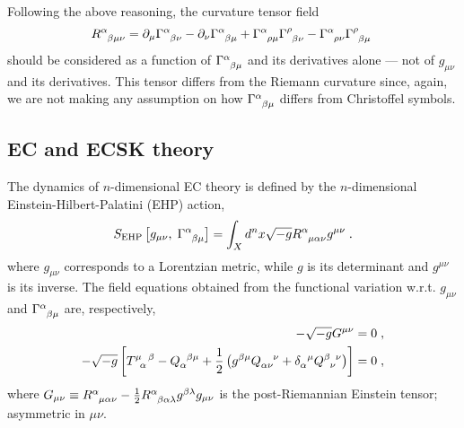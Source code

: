 \documentclass[../../main.tex]{subfiles}
\begin{document}
Following the above reasoning, the curvature tensor field
\begin{equation}
  \label{eq:curvaturetensor}
  \tensor{R}{^\alpha_{\beta\mu\nu}} = \partial_\mu\tensor{\Gamma}{^\alpha_{\beta\nu}}-\partial_\nu\tensor{\Gamma}{^\alpha_{\beta\mu}}+\tensor{\Gamma}{^\alpha_{\rho\mu}}\tensor{\Gamma}{^\rho_{\beta\nu}}-\tensor{\Gamma}{^\alpha_{\rho\nu}}\tensor{\Gamma}{^\rho_{\beta\mu}} \;
\end{equation}
should be considered as a function of $\tensor{\Gamma}{^\alpha_{\beta\mu}}$ and its derivatives alone --- not of $g_{\mu\nu}$ and its derivatives. This tensor differs from the Riemann curvature since, again, we are not making any assumption on how $\tensor{\Gamma}{^\alpha_{\beta\mu}}$ differs from Christoffel symbols.

\subsection{EC and ECSK theory}\label{ssec:ec_theory}

The dynamics of $n$-dimensional EC theory is defined by the $n$-dimensional Einstein-Hilbert-Palatini (EHP) action,
\begin{equation}\label{eq:holonomic-EP-action}
  S_{\text{EHP}}\left[g_{\mu\nu},\;\tensor{\Gamma}{^\alpha_{\beta\mu}}\right]=\int_{X} d^n x \sqrt{-g}\tensor{R}{^\alpha_{\mu\alpha\nu}}g^{\mu\nu}\;.
\end{equation}
where $g_{\mu\nu}$ corresponds to a Lorentzian metric, while $g$ is its determinant and $g^{\mu\nu}$ is its inverse. The field equations obtained from the functional variation w.r.t. $g_{\mu\nu}$ and $\tensor{\Gamma}{^\alpha_{\beta\mu}}$ are, respectively,
\begin{subequations}\label{eq:holonomic-field-eqs}
  \begin{align}
    -\sqrt{-g}G^{\mu\nu}                                                                                                                                                                                            & = 0 \;, \label{eq:holonomic-einstein-like-field-eqs} \\
    -\sqrt{-g}\left[\tensor{T}{^\mu_\alpha^\beta}-\tensor{Q}{_\alpha^{\beta\mu}} + \frac{1}{2} \left(g^{\beta\mu}\tensor{Q}{_{\alpha\nu}^\nu}+\tensor{\delta}{_\alpha^\mu}\tensor{Q}{^\beta_\nu^\nu}\right) \right] & = 0\;, \label{eq:holonomic-cartan-like-field-eqs}
  \end{align}
\end{subequations}
where $G_{\mu\nu} \equiv \tensor{R}{^\alpha_{\mu\alpha\nu}} - \frac{1}{2} \tensor{R}{^\alpha_{\beta\alpha\lambda}}g^{\beta\lambda}g_{\mu\nu}$ is the post-Riemannian Einstein tensor;  asymmetric in $\mu\nu$.
\end{document}

